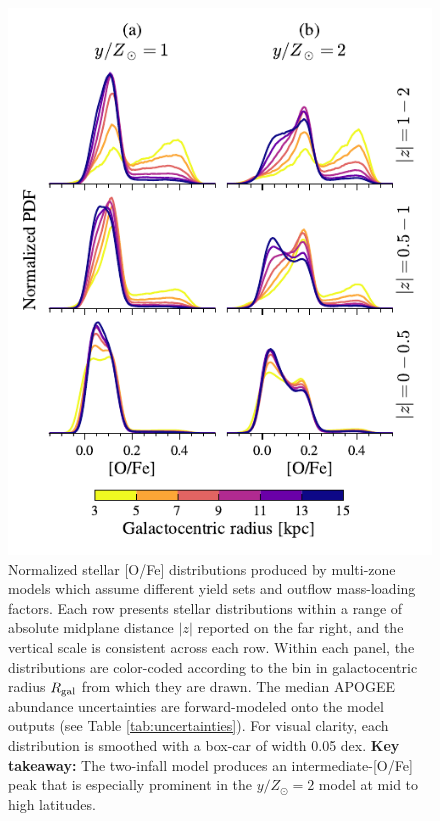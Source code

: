 \documentclass[twocolumn,twocolappendix,linenumbers]{aastex631}
\newcommand{\yZ}[1]{$y/Z_\odot=#1$}
\begin{document}
\begin{figure}
    \centering
    \includegraphics[width=\linewidth]{src/tex/figures/ofe_distribution_yields.pdf}
    \caption{Normalized stellar [O/Fe] distributions produced by multi-zone models which assume different yield sets and outflow mass-loading factors. Each row presents stellar distributions within a range of absolute midplane distance $|z|$ reported on the far right, and the vertical scale is consistent across each row. Within each panel, the distributions are color-coded according to the bin in galactocentric radius $R_{\rm gal}$ from which they are drawn. The median APOGEE abundance uncertainties are forward-modeled onto the model outputs (see Table \ref{tab:uncertainties}). For visual clarity, each distribution is smoothed with a box-car of width 0.05 dex. {\bf Key takeaway:} The two-infall model produces an intermediate-[O/Fe] peak that is especially prominent in the \yZ{2} model at mid to high latitudes.}
    \label{fig:ofe-distribution-yields}
\end{figure}
\end{document}
